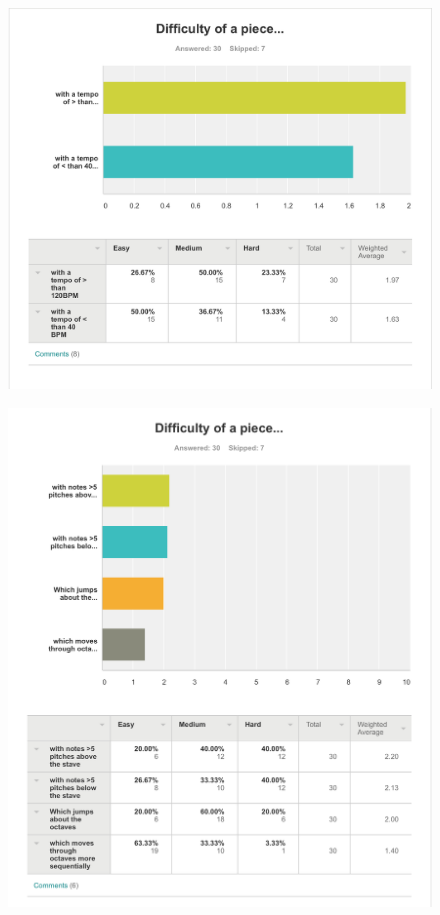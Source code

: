 \begin{appendices}
\begin{figure}[H]
\centering
\includegraphics[width=\textwidth]{survey_results/tempo}
\end{figure}

\begin{figure}[H]
\centering
\includegraphics[width=\textwidth]{survey_results/pitches}


\end{figure}
\end{appendices}
